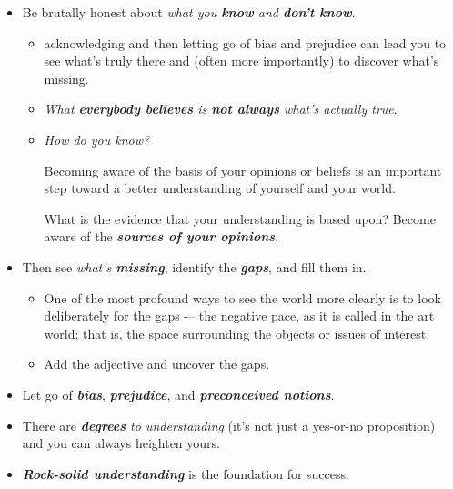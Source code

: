 \documentclass[11pt]{article}
\begin{document}
\begin{itemize}
\item Be brutally honest about \emph{what you \textbf{know} and \textbf{don’t know}}. 
\begin{itemize}
\item acknowledging and then letting go of bias and prejudice can lead you to see what’s truly there and (often more importantly) to discover what’s missing.
\item \emph{What \textbf{everybody believes} is \textbf{not always} what’s actually true}.

\item \emph{How do you know?} 

Becoming aware of the basis of your opinions or beliefs is an important step toward a better understanding of yourself and your world.

What is the evidence that your understanding is based upon? Become aware of the \emph{\textbf{sources of your opinions}}.
\end{itemize}

\item Then see \emph{what’s \textbf{missing}}, identify the \emph{\textbf{gaps}}, and fill them in. 
\begin{itemize}
\item One of the most profound ways to see the world more clearly is to look deliberately for the gaps -– the negative pace, as it is called in the art world; that is, the space surrounding the objects or issues of interest.

\item Add the adjective and uncover the gaps.
\end{itemize}

\item Let go of \emph{\textbf{bias}}, \emph{\textbf{prejudice}}, and \emph{\textbf{preconceived notions}}. 
\item There are \emph{\textbf{degrees} to understanding} (it’s not just a yes-or-no proposition) and you can always heighten yours. 
\item \emph{\textbf{Rock-solid understanding}} is the foundation for success.
\end{itemize}
\end{document}
